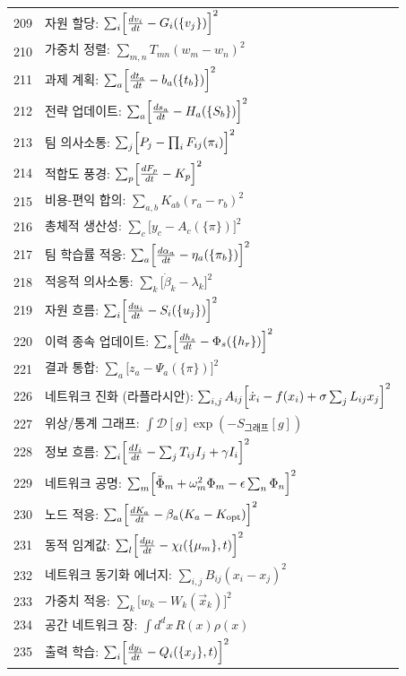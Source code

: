 \documentclass[11pt,a4paper]{article}
\begin{document}
\begin{longtable}{r l}
		209 & 자원 할당: $\sum_i\Bigl[\frac{dv_i}{dt} - G_i(\{v_j\})\Bigr]^2$ \\
		210 & 가중치 정렬: $\sum_{m,n}T_{mn}(w_m - w_n)^2$ \\
		211 & 과제 계획: $\sum_a\Bigl[\frac{dt_a}{dt} - b_a(\{t_b\})\Bigr]^2$ \\
		212 & 전략 업데이트: $\sum_a\Bigl[\frac{ds_a}{dt} - H_a(\{S_b\})\Bigr]^2$ \\
		213 & 팀 의사소통: $\sum_j\Bigl[P_j - \prod_i F_{ij}(\pi_i)\Bigr]^2$ \\
		214 & 적합도 풍경: $\sum_p\Bigl[\frac{dF_p}{dt} - K_p\Bigr]^2$ \\
		215 & 비용-편익 합의: $\sum_{a,b}K_{ab}(r_a - r_b)^2$ \\
		216 & 총체적 생산성: $\sum_c\bigl[y_c - A_c(\{\pi\})\bigr]^2$ \\
		217 & 팀 학습률 적응: $\sum_a\Bigl[\frac{d\alpha_a}{dt} - \eta_a(\{\pi_b\})\Bigr]^2$ \\
		218 & 적응적 의사소통: $\sum_k\bigl[\dot\beta_k - \lambda_k\bigr]^2$ \\
		219 & 자원 흐름: $\sum_i\Bigl[\frac{du_i}{dt} - S_i(\{u_j\})\Bigr]^2$ \\
		220 & 이력 종속 업데이트: $\sum_s\Bigl[\frac{dh_s}{dt} - \Phi_s(\{h_r\})\Bigr]^2$ \\
		221 & 결과 통합: $\sum_a\bigl[z_a - \Psi_a(\{\pi\})\bigr]^2$ \\
		226 & 네트워크 진화 (라플라시안): $\sum_{i,j}A_{ij}\Bigl[\dot x_i - f(x_i) + \sigma\sum_j L_{ij}x_j\Bigr]^2$ \\
		227 & 위상/통계 그래프: $\int\mathcal{D}[g]\exp(-S_{\text{그래프}}[g])$ \\
		228 & 정보 흐름: $\sum_i\Bigl[\frac{dI_i}{dt} - \sum_j T_{ij}I_j + \gamma I_i\Bigr]^2$ \\
		229 & 네트워크 공명: $\sum_m\Bigl[\ddot\Phi_m + \omega_m^2\Phi_m - \epsilon\sum_n\Phi_n\Bigr]^2$ \\
		230 & 노드 적응: $\sum_a\Bigl[\frac{dK_a}{dt} - \beta_a(K_a - K_{\text{opt}})\Bigr]^2$ \\
		231 & 동적 임계값: $\sum_l\Bigl[\frac{d\mu_l}{dt} - \chi_l(\{\mu_m\},t)\Bigr]^2$ \\
		232 & 네트워크 동기화 에너지: $\sum_{i,j}B_{ij}(x_i - x_j)^2$ \\
		233 & 가중치 적응: $\sum_k\bigl[w_k - W_k(\vec x_k)\bigr]^2$ \\
		234 & 공간 네트워크 장: $\int d^dx\,R(x)\rho(x)$ \\
		235 & 출력 학습: $\sum_i\Bigl[\frac{dy_i}{dt} - Q_i(\{x_j\},t)\Bigr]^2$ \\

\end{longtable}
\end{document}
